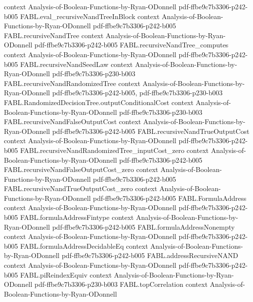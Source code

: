 \begin{theorem}
  {context}
  {Analysis-of-Boolean-Functions-by-Ryan-ODonnell}
  {pdf-ffbe9c7b3306-p242-b005}
\proofstep
  {FABL.eval_recursiveNandTreeInBlock}
  {context}
  {Analysis-of-Boolean-Functions-by-Ryan-ODonnell}
  {pdf-ffbe9c7b3306-p242-b005}
\proofstep
  {FABL.recursiveNandTree}
  {context}
  {Analysis-of-Boolean-Functions-by-Ryan-ODonnell}
  {pdf-ffbe9c7b3306-p242-b005}
\proofstep
  {FABL.recursiveNandTree_computes}
  {context}
  {Analysis-of-Boolean-Functions-by-Ryan-ODonnell}
  {pdf-ffbe9c7b3306-p242-b005}
\proofstep
  {FABL.recursiveNandSeedLaw}
  {context}
  {Analysis-of-Boolean-Functions-by-Ryan-ODonnell}
  {pdf-ffbe9c7b3306-p230-b003}
\proofstep
  {FABL.recursiveNandRandomizedTree}
  {context}
  {Analysis-of-Boolean-Functions-by-Ryan-ODonnell}
  {pdf-ffbe9c7b3306-p242-b005,
    pdf-ffbe9c7b3306-p230-b003}
\proofstep
  {FABL.RandomizedDecisionTree.outputConditionalCost}
  {context}
  {Analysis-of-Boolean-Functions-by-Ryan-ODonnell}
  {pdf-ffbe9c7b3306-p230-b003}
\proofstep
  {FABL.recursiveNandFalseOutputCost}
  {context}
  {Analysis-of-Boolean-Functions-by-Ryan-ODonnell}
  {pdf-ffbe9c7b3306-p242-b005}
\proofstep
  {FABL.recursiveNandTrueOutputCost}
  {context}
  {Analysis-of-Boolean-Functions-by-Ryan-ODonnell}
  {pdf-ffbe9c7b3306-p242-b005}
\proofstep
  {FABL.recursiveNandRandomizedTree_inputCost_zero}
  {context}
  {Analysis-of-Boolean-Functions-by-Ryan-ODonnell}
  {pdf-ffbe9c7b3306-p242-b005}
\proofstep
  {FABL.recursiveNandFalseOutputCost_zero}
  {context}
  {Analysis-of-Boolean-Functions-by-Ryan-ODonnell}
  {pdf-ffbe9c7b3306-p242-b005}
\proofstep
  {FABL.recursiveNandTrueOutputCost_zero}
  {context}
  {Analysis-of-Boolean-Functions-by-Ryan-ODonnell}
  {pdf-ffbe9c7b3306-p242-b005}
\proofstep
  {FABL.FormulaAddress}
  {context}
  {Analysis-of-Boolean-Functions-by-Ryan-ODonnell}
  {pdf-ffbe9c7b3306-p242-b005}
\proofstep
  {FABL.formulaAddressFintype}
  {context}
  {Analysis-of-Boolean-Functions-by-Ryan-ODonnell}
  {pdf-ffbe9c7b3306-p242-b005}
\proofstep
  {FABL.formulaAddressNonempty}
  {context}
  {Analysis-of-Boolean-Functions-by-Ryan-ODonnell}
  {pdf-ffbe9c7b3306-p242-b005}
\proofstep
  {FABL.formulaAddressDecidableEq}
  {context}
  {Analysis-of-Boolean-Functions-by-Ryan-ODonnell}
  {pdf-ffbe9c7b3306-p242-b005}
\proofstep
  {FABL.addressRecursiveNAND}
  {context}
  {Analysis-of-Boolean-Functions-by-Ryan-ODonnell}
  {pdf-ffbe9c7b3306-p242-b005}
\proofstep
  {FABL.piReindexEquiv}
  {context}
  {Analysis-of-Boolean-Functions-by-Ryan-ODonnell}
  {pdf-ffbe9c7b3306-p230-b003}
\proofstep
  {FABL.topCorrelation}
  {context}
  {Analysis-of-Boolean-Functions-by-Ryan-ODonnell}

\end{theorem}
